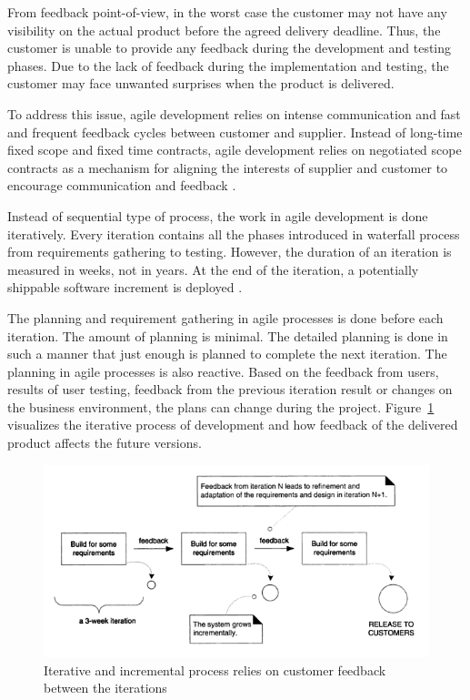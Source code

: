 \documentclass[english,12pt,a4paper,pdftex]{article}
\begin{document}
From feedback point-of-view, in the worst case the customer may not have any visibility on the actual product before the agreed delivery deadline. Thus, the customer is unable to provide any feedback during the development and testing phases. Due to the lack of feedback during the implementation and testing, the customer may face unwanted surprises when the product is delivered.

To address this issue, agile development relies on intense communication and fast and frequent feedback cycles between customer and supplier. Instead of long-time fixed scope and fixed time contracts, agile development relies on negotiated scope contracts as a mechanism for aligning the interests of supplier and customer to encourage communication and feedback \citep{beck2004}.

Instead of sequential type of process, the work in agile development is done iteratively. Every iteration contains all the phases introduced in waterfall process from requirements gathering to testing. However, the duration of an iteration is measured in weeks, not in years. At the end of the iteration, a potentially shippable software increment is deployed \citep{shore2007}.

The planning and requirement gathering in agile processes is done before each iteration. The amount of planning is minimal. The detailed planning is done in such a manner that just enough is planned to complete the next iteration. The planning in agile processes is also reactive. Based on the feedback from users, results of user testing, feedback from the previous iteration result or changes on the business environment, the plans can change during the project. Figure~\ref{fig:iterative_and_incremental} visualizes the iterative process of development and how feedback of the delivered product affects the future versions.

\begin{figure}[htb]
\begin{center}
\includegraphics[width=1.0\textwidth]{iterative_and_incremental.png}
\end{center}
\caption{Iterative and incremental process relies on customer feedback between the iterations \citep{larman2004}}
\label{fig:iterative_and_incremental}
\end{figure}
\end{document}
